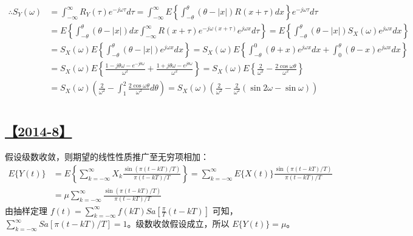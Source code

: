 \begin{equation}\tag*{}
\begin{split}
\therefore S_Y(\omega)&=\int_{-\infty}^{\infty}R_Y(\tau)e^{-j\omega\tau}d\tau=\int_{-\infty}^{\infty}E\left\{\int_{-\theta}^{\theta}(\theta-|x|)R(x+\tau)dx\right\}e^{-j\omega\tau}d\tau\\
&=E\left\{\int_{-\theta}^{\theta}(\theta-|x|)dx\int_{-\infty}^{\infty}R(x+\tau)e^{-j\omega(x+\tau)}e^{j\omega x}d\tau\right\}=E\left\{\int_{-\theta}^{\theta}(\theta-|x|)S_X(\omega)e^{j\omega x}dx\right\}\\
&=S_X(\omega)E\left\{\int_{-\theta}^{\theta}(\theta-|x|)e^{j\omega x}dx\right\}=S_X(\omega)E\left\{\int_{-\theta}^{0}(\theta+x)e^{j\omega x}dx+\int_{0}^{\theta}(\theta-x)e^{j\omega x}dx\right\}\\
&=S_X(\omega)E\left\{\frac{1-j\theta\omega-e^{-j\theta\omega}}{\omega^2}+\frac{1+j\theta\omega-e^{j\theta\omega}}{\omega^2}\right\}=S_X(\omega)E\left\{\frac{2}{\omega^2}-\frac{2\cos\omega\theta}{\omega^2}\right\}\\
&=S_X(\omega)\left(\frac{2}{\omega^2}-\int_1^2\frac{2\cos\omega\theta}{\omega^2}d\theta\right)=S_X(\omega)\left(\frac{2}{\omega^2}-\frac{2}{\omega^2}(\sin2\omega-\sin\omega)\right)
\end{split}
\end{equation}

\section{}

\subsection{\hyperref[Q2014-8]{【2014-8】}}\label{A2014-8}
假设级数收敛，则期望的线性性质推广至无穷项相加：
\begin{equation}\tag*{}
\begin{split}
E\{Y(t)\}&=E\left\{\sum_{k=-\infty}^{\infty}X_k\frac{\sin(\pi(t-kT)/T)}{\pi(t-kT)/T}\right\}=\sum_{k=-\infty}^{\infty}E\{X(t)\}\frac{\sin(\pi(t-kT)/T)}{\pi(t-kT)/T}\\
&=\mu\sum_{k=-\infty}^{\infty}\frac{\sin(\pi(t-kT)/T)}{\pi(t-kT)/T}
\end{split}
\end{equation}
由抽样定理 $f(t)=\sum_{k=-\infty}^{\infty}f(kT)Sa\left[\frac{\pi}{T}(t-kT)\right]$ 可知，$\sum_{k=-\infty}^{\infty}Sa\left[\pi(t-kT)/T\right]=1$。级数收敛假设成立，所以 $E\{Y(t)\}=\mu$。


